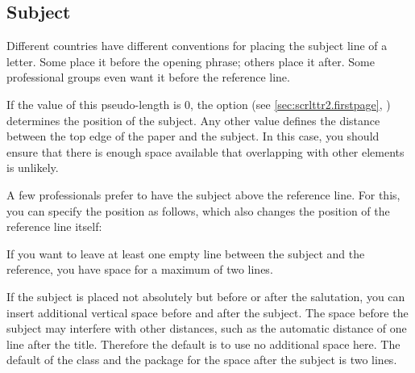\subsection{Subject}
%
\BeginIndexGroup
{}

Different countries have different conventions for placing the subject line of
a letter. Some place it before the opening phrase; others place it after. Some
professional groups even want it before the reference line.

\begin{Declaration}
\end{Declaration}
%
If the value of this pseudo-length is 0, the
%
 option (see
\autoref{sec:scrlttr2.firstpage}, )
determines the position of the subject. Any other value defines the distance
between the top edge of the paper and the subject. In this
case, you should ensure that there is enough space available
that overlapping with other elements is unlikely.
\begin{Example}
  A few professionals prefer to have the subject above the reference line. For
  this, you can specify the position as follows, which also changes the
  position of the reference line itself:
  If you want to leave at least one empty line between the subject and the
  reference, you have space for a maximum of two lines.
\end{Example}
\EndIndexGroup


\begin{Declaration}
\end{Declaration}
%
If the subject is placed not absolutely but before or after the salutation,
you can insert additional vertical space before and after the subject. The
space before the subject may interfere with other distances, such as the
automatic distance of one line after the title. Therefore the default is to
use no additional space here. The default of the class and the package for the
space after the subject is two lines.%
\EndIndexGroup
%
\EndIndexGroup


